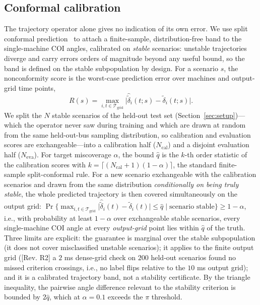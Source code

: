 \documentclass[5p,times]{elsarticle}
\begin{document}
\subsection{Conformal calibration}
The trajectory operator alone gives no indication of its own error. We use split conformal
prediction~\cite{lei2018distribution} to attach a finite-sample, distribution-free band to the
single-machine COI angles, calibrated on \emph{stable} scenarios: unstable trajectories diverge
and carry errors orders of magnitude beyond any useful bound, so the band is defined on the stable
subpopulation by design. For a scenario $s$, the nonconformity score is the worst-case prediction error over
machines and output-grid time points,
\begin{equation}
R(s) = \max_{i,t\in\mathcal{T}_{\mathrm{grid}}} \bigl| \hat{\tilde\delta}_i(t;s) - \tilde\delta_i(t;s) \bigr| .
\end{equation}
We split the $N$ stable scenarios of the held-out test set (Section~\ref{sec:setup})---which the
operator never saw during training and which are drawn at random from the same held-out-bus
sampling distribution, so calibration and evaluation scores are exchangeable---into a calibration
half ($N_{\mathrm{cal}}$) and a disjoint evaluation half ($N_{\mathrm{eva}}$). For target
miscoverage $\alpha$, the bound $\hat q$ is the $k$-th order statistic of the calibration scores
with $k=\lceil(N_{\mathrm{cal}}+1)(1-\alpha)\rceil$, the standard finite-sample split-conformal
rule. For a new scenario exchangeable with the calibration scenarios and drawn from the same
distribution \emph{conditionally on being truly stable}, the whole predicted trajectory is then
covered simultaneously on the output grid: $\Pr\{ \max_{i,t\in\mathcal{T}_{\mathrm{grid}}}
\bigl| \hat{\tilde\delta}_i(t) - \tilde\delta_i(t) \bigr| \le \hat q \mid \text{scenario stable} \}
\ge 1-\alpha$, i.e., with probability at least $1-\alpha$ over exchangeable stable scenarios,
every single-machine COI angle at every \emph{output-grid} point lies within $\hat q$ of the
truth. Three limits are
explicit: the guarantee is marginal over the stable subpopulation (it does not cover misclassified
unstable scenarios); it applies to the finite output grid ([Rev. R2] a $2$ ms dense-grid check on $200$ held-out
scenarios found no missed criterion crossings, i.e., no label flips relative to the $10$ ms
output grid); and it is a calibrated trajectory band, not a
stability certificate. By the triangle inequality, the pairwise angle difference relevant to the
stability criterion is bounded by $2\hat q$, which at $\alpha{=}0.1$ exceeds the $\pi$ threshold.
\end{document}
